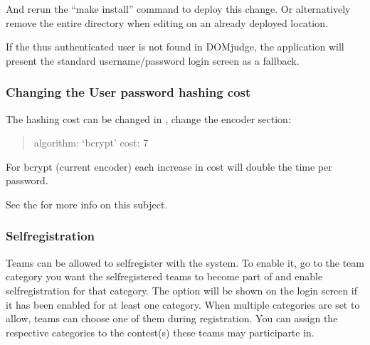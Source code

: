 \documentclass[a4paper,10pt,english,openany]{sphinxmanual}
\begin{document}
\sphinxAtStartPar
And re\sphinxhyphen{}run the “make install” command to deploy this change.
Or alternatively remove the entire  directory when
editing  on an already deployed location.

\sphinxAtStartPar
If the thus authenticated user is not found in DOMjudge, the application
will present the standard username/password login screen as a fallback.


\subsubsection{Changing the User password hashing cost}
\label{\detokenize{config-advanced:changing-the-user-password-hashing-cost}}
\sphinxAtStartPar
The hashing cost can be changed in , change the encoder section:
\begin{quote}
\begin{description}
\begin{description}
\sphinxAtStartPar
algorithm: ‘bcrypt’
cost: 7

\end{description}

\end{description}
\end{quote}

\sphinxAtStartPar
For bcrypt (current encoder) each increase in cost will double the time per password.

\sphinxAtStartPar
See the  for more info on this subject.


\subsubsection{Self\sphinxhyphen{}registration}
\label{\detokenize{config-advanced:self-registration}}
\sphinxAtStartPar
Teams can be allowed to self\sphinxhyphen{}register with the system. To enable it, go to
the team category you want the self\sphinxhyphen{}registered teams to become part of and
enable self\sphinxhyphen{}registration for that category. The option will be shown on the
login screen if it has been enabled for at least one category. When multiple
categories are set to allow, teams can choose one of them during registration.
You can assign the respective categories to the contest(s) these teams may
participarte in.
\end{document}
